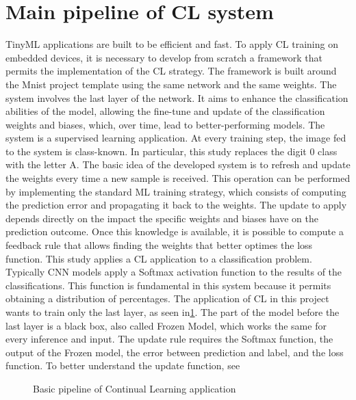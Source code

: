 \section{Main pipeline of CL system}
\label{sec:main_pipeline}
\quad TinyML applications are built to be efficient and fast. To apply CL training on embedded devices, it is necessary to develop from scratch a framework that permits the implementation of the CL strategy. The framework is built around the Mnist project template using the same network and the same weights. The system involves the last layer of the network. It aims to enhance the classification abilities of the model, allowing the fine-tune and update of the classification weights and biases, which, over time, lead to better-performing models. The system is a supervised learning application. At every training step, the image fed to the system is class-known. In particular, this study replaces the digit 0 class with the letter A. 
\quad The basic idea of the developed system is to refresh and update the weights every time a new sample is received. This operation can be performed by implementing the standard ML training strategy, which consists of computing the prediction error and propagating it back to the weights. The update to apply depends directly on the impact the specific weights and biases have on the prediction outcome. Once this knowledge is available, it is possible to compute a feedback rule that allows finding the weights that better optimes the loss function. This study applies a CL application to a classification problem. Typically CNN models apply a Softmax activation function to the results of the classifications. This function is fundamental in this system because it permits obtaining a distribution of percentages. The application of CL in this project wants to train only the last layer, as seen in\ref{CL_pipeline}. The part of the model before the last layer is a black box, also called Frozen Model, which works the same for every inference and input. The update rule requires the Softmax function, the output of the Frozen model, the error between prediction and label, and the loss function. To better understand the update function, see \cite[p.~32]{Comprarison_of_Continual_learning_algorithm}

\begin{figure}[!ht]
\centerline{}
\caption{Basic pipeline of Continual Learning application}
\label{CL_pipeline}
\end{figure}


